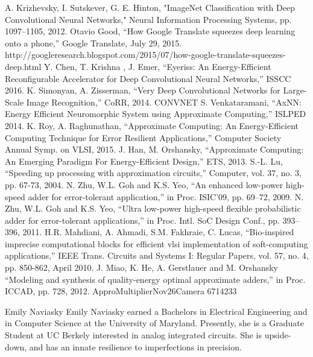\documentclass[journal]{IEEEtran}
\begin{document}
\begin{thebibliography}{1}

\bibitem{}
A. Krizhevsky, I. Sutskever, G. E. Hinton, "ImageNet Classification with Deep Convolutional Neural Networks," Neural Information Processing Systems, pp. 1097–1105, 2012.	
\bibitem{} Otavio Good, “How Google Translate squeezes deep learning onto a phone,” Google Translate, July 29, 2015. http://googleresearch.blogspot.com/2015/07/how-google-translate-squeezes-deep.html
\bibitem{} Y. Chen, T. Krishna , J. Emer, “Eyeriss: An Energy-Efficient Reconfigurable Accelerator for Deep Convolutional Neural Networks,” ISSCC 2016.
\bibitem{} K. Simonyan, A. Zisserman, “Very Deep Convolutional Networks for Large- Scale Image Recognition,” CoRR, 2014. 
\bibitem{} CONVNET
\bibitem{} S. Venkataramani, “AxNN: Energy Efficient Neuromorphic System using Approximate Computing,” ISLPED 2014.
\bibitem{} K. Roy, A. Raghunathan, “Approximate Computing: An Energy-Efficient Computing Technique for Error Resilient Applications,” Computer Society Annual Symp. on VLSI, 2015.
\bibitem{} J. Han, M. Orshansky, “Approximate Computing: An Emerging Paradigm For Energy-Efficient Design,” ETS, 2013.
\bibitem{} S.-L. Lu, “Speeding up processing with approximation circuits,”
Computer, vol. 37, no. 3, pp. 67-73, 2004.
\bibitem{}N. Zhu, W.L. Goh and K.S. Yeo, “An enhanced low-power high-speed adder for error-tolerant application,” in Proc. ISIC’09, pp. 69–72, 2009.
\bibitem{}N. Zhu, W.L. Goh and K.S. Yeo, “Ultra low-power high-speed flexible probabilistic adder for error-tolerant applications,” in Proc. Intl. SoC Design Conf., pp. 393–396, 2011.
\bibitem{}H.R. Mahdiani, A. Ahmadi, S.M. Fakhraie, C. Lucas, “Bio-inspired imprecise computational blocks for efficient vlsi implementation of soft-computing applications,” IEEE Trans. Circuits and Systems I: Regular
Papers, vol. 57, no. 4, pp. 850-862, April 2010.
\bibitem{}J. Miao, K. He, A. Gerstlauer and M. Orshansky “Modeling and synthesis of quality-energy optimal approximate adders,” in Proc.
ICCAD, pp. 728, 2012.
\bibitem{}ApproMultiplierNov26Camera
\bibitem{}6714233
\bibitem{}
\bibitem{}
\bibitem{}


\end{thebibliography}

\begin{IEEEbiography}{Emily Naviasky}
Emily Naviasky earned a Bachelors in Electrical Engineering and in Computer Science at the University of Maryland. Presently, she is a Graduate Student at UC Berkely interested in analog integrated circuits. She is upside-down, and has an innate resilience to imperfections in precision.
\end{IEEEbiography}
\end{document}
